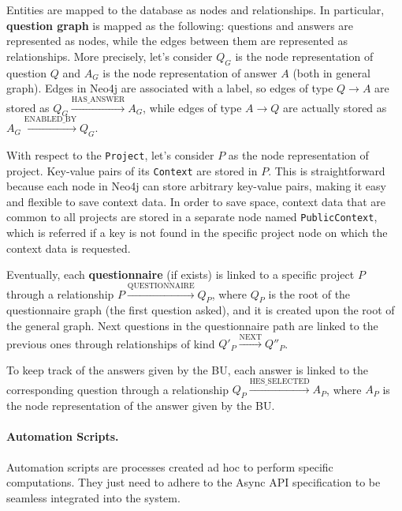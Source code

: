 \documentclass[12pt,a4paper,openright,twoside]{book}
\begin{document}
Entities are mapped to the database as nodes and relationships.
%
In particular, \textbf{question graph} is mapped as the following: questions and answers are represented as nodes, while the edges between them are represented as relationships.
%
More precisely, let's consider $Q_G$ is the node representation of question $Q$ and $A_G$ is the node representation of answer $A$ (both in general graph).
%
Edges in Neo4j are associated with a label, so edges of type $Q \to A$ are stored as $Q_G \xrightarrow{\text{HAS\_ANSWER}} A_G$, while edges of type $A \to Q$ are actually stored as $A_G \xrightarrow{\text{ENABLED\_BY}} Q_G$.


With respect to the \texttt{Project}, let's consider $P$ as the node representation of project.
%
Key-value pairs of its \texttt{Context} are stored in $P$.
%
This is straightforward because each node in Neo4j can store arbitrary key-value pairs, making it easy and flexible to save context data.
%
In order to save space, context data that are common to all projects are stored in a separate node named \texttt{PublicContext}, which is referred if a key is not found in the specific project node on which the context data is requested.

Eventually, each \textbf{questionnaire} (if exists) is linked to a specific project $P$ through a relationship $P \xrightarrow{\text{QUESTIONNAIRE}} Q_P$, where $Q_P$ is the root of the questionnaire graph (the first question asked), and it is created upon the root of the general graph.
%
Next questions in the questionnaire path are linked to the previous ones through relationships of kind $Q'_P \xrightarrow{\text{NEXT}} Q''_P$.

To keep track of the answers given by the \ac{BU}, each answer is linked to the corresponding question through a relationship $Q_P \xrightarrow{\text{HES\_SELECTED}} A_P$, where $A_P$ is the node representation of the answer given by the \ac{BU}.

\paragraph{Automation Scripts.}

Automation scripts are processes created ad hoc to perform specific computations.
%
They just need to adhere to the Async API specification to be seamless integrated into the system.
%
\end{document}

